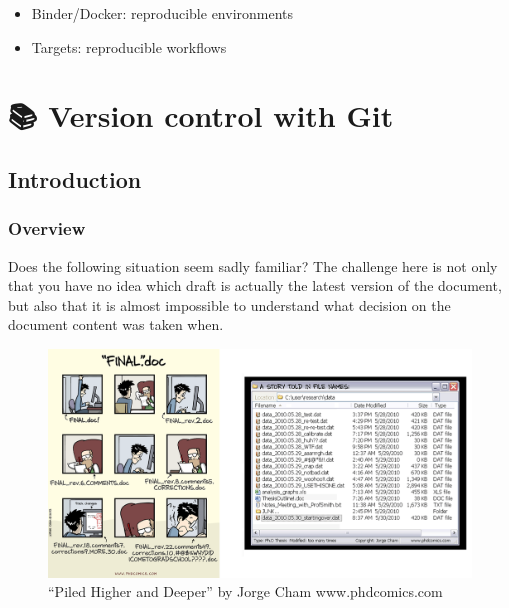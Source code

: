 \documentclass[
  letterpaper,
  DIV=11,
  numbers=noendperiod,
  oneside]{scrreprt}
\providecommand{\tightlist}{%
  \setlength{\itemsep}{0pt}\setlength{\parskip}{0pt}}\usepackage{longtable,booktabs,array}
\begin{document}
\begin{itemize}
\tightlist
\item
  Binder/Docker: reproducible environments
\item
  Targets: reproducible workflows
\end{itemize}

\hypertarget{version-control-with-git}{%
\chapter{\texorpdfstring{{📚} Version control with
Git}{📚 Version control with Git}}\label{version-control-with-git}}

\hypertarget{introduction-3}{%
\section{Introduction}\label{introduction-3}}

\hypertarget{overview-1}{%
\subsection{Overview}\label{overview-1}}

Does the following situation seem sadly familiar? The challenge here is
not only that you have no idea which draft is actually the latest
version of the document, but also that it is almost impossible to
understand what decision on the document content was taken when.

\begin{figure}

{\centering \includegraphics{images/paste-2840AEE3.png}

}

\caption{\label{fig-final-doc}``Piled Higher and Deeper'' by Jorge Cham
www.phdcomics.com}

\end{figure}
\end{document}
